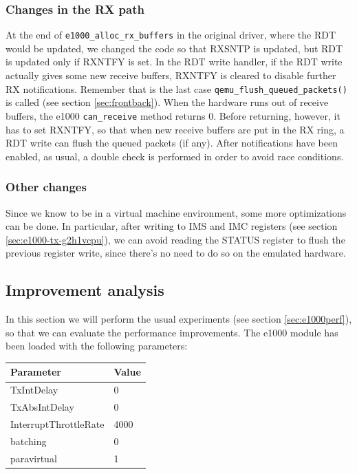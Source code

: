\subsubsection{Changes in the RX path}
At the end of \texttt{e1000\_alloc\_rx\_buffers} in the original driver, where the RDT would be updated, we changed the code so that
RXSNTP is updated, but RDT is updated only if RXNTFY is set.
In the RDT write handler, if the RDT write actually gives some new receive buffers, RXNTFY is cleared to disable further RX notifications.
Remember that is the last case \texttt{qemu\_flush\_queued\_packets()} is called (see section \ref{sec:frontback}). 
When the hardware runs out of receive buffers, the e1000 \texttt{can\_receive} method returns 0. Before returning, however, it has to
set RXNTFY, so that when new receive buffers are put in the RX ring, a RDT write can flush the queued packets (if any).
After notifications have been enabled, as usual, a double check is performed in order to avoid race conditions.


\subsubsection{Other changes}
Since we know to be in a virtual machine environment, some more optimizations can be done.
In particular, after writing to IMS and IMC registers (see section \ref{sec:e1000-tx-g2h1vcpu}), we can avoid reading the STATUS register
to flush the previous register write, since there's no need to do so on the emulated hardware.


\subsection{Improvement analysis}
In this section we will perform the usual experiments (see section \ref{sec:e1000perf}), so that we can evaluate the performance
improvements. The e1000 module has been loaded with the following parameters:
\begin{center}
\begin{tabular}{ll}
\toprule
\textbf{Parameter} & \textbf{Value}\\
\midrule
TxIntDelay & 0\\
TxAbsIntDelay & 0\\
InterruptThrottleRate & 4000\\
batching & 0\\
paravirtual & 1\\
\bottomrule
\end{tabular}
\end{center}


